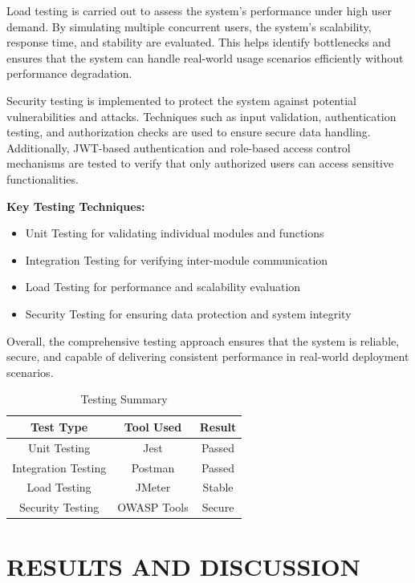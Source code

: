\documentclass[conference]{IEEEtran}
\begin{document}
Load testing is carried out to assess the system’s performance under high user demand. By simulating multiple concurrent users, the system’s scalability, response time, and stability are evaluated. This helps identify bottlenecks and ensures that the system can handle real-world usage scenarios efficiently without performance degradation.

Security testing is implemented to protect the system against potential vulnerabilities and attacks. Techniques such as input validation, authentication testing, and authorization checks are used to ensure secure data handling. Additionally, JWT-based authentication and role-based access control mechanisms are tested to verify that only authorized users can access sensitive functionalities.

\textbf{Key Testing Techniques:}
\begin{itemize}
\item Unit Testing for validating individual modules and functions
\item Integration Testing for verifying inter-module communication
\item Load Testing for performance and scalability evaluation
\item Security Testing for ensuring data protection and system integrity
\end{itemize}

Overall, the comprehensive testing approach ensures that the system is reliable, secure, and capable of delivering consistent performance in real-world deployment scenarios.

\begin{table}[htbp]
\caption{Testing Summary}
\centering
\begin{tabular}{|c|c|c|}
\hline
Test Type & Tool Used & Result \\
\hline
Unit Testing & Jest & Passed \\
Integration Testing & Postman & Passed \\
Load Testing & JMeter & Stable \\
Security Testing & OWASP Tools & Secure \\
\hline
\end{tabular}
\end{table}

 
\section{RESULTS AND DISCUSSION}
\end{document}
